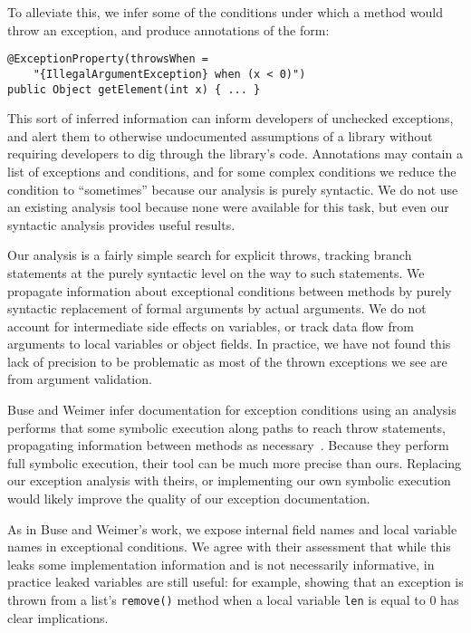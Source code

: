 To alleviate this, we infer some of the conditions under which a method would
throw an exception, and produce annotations of the form:

\begin{verbatim}
@ExceptionProperty(throwsWhen =
    "{IllegalArgumentException} when (x < 0)")
public Object getElement(int x) { ... }
\end{verbatim}

This sort of inferred information can inform developers of unchecked exceptions,
and alert them to otherwise undocumented assumptions of a library without
requiring developers to dig through the library's code.
Annotations may contain a list of exceptions and conditions, and for some
complex conditions we reduce the condition to ``sometimes'' because our analysis
is purely syntactic.  We do not use an
existing analysis tool because none were available for this task, but even our
syntactic analysis provides useful results.

Our analysis is a fairly simple search for explicit throws, tracking branch
statements at the purely syntactic level on the
way to such statements.  We propagate information about exceptional conditions
between methods by purely syntactic replacement of formal arguments by actual
arguments.  We do not account for intermediate side effects on variables, or
track data flow from arguments to local variables or object fields.  In
practice, we have not found this lack of precision to be problematic as most of
the thrown exceptions we see are from argument validation.

Buse and Weimer infer documentation for exception conditions
using an analysis performs that some symbolic execution along paths to reach throw
statements, propagating information between methods as necessary~\cite{autodoc}.
Because they
perform full symbolic execution, their tool can be much more precise than ours.
Replacing our exception analysis with theirs, or implementing our own symbolic
execution would likely improve the quality of our exception documentation.  

As in Buse and Weimer's work, we expose internal field names and
local variable names in exceptional conditions.  We agree with their assessment
that while this leaks some
implementation information and is not necessarily informative, in practice
leaked variables are still useful: for example, showing that an exception is
thrown from a list's \texttt{remove()} method when a local variable \texttt{len}
is equal to 0 has clear implications.

